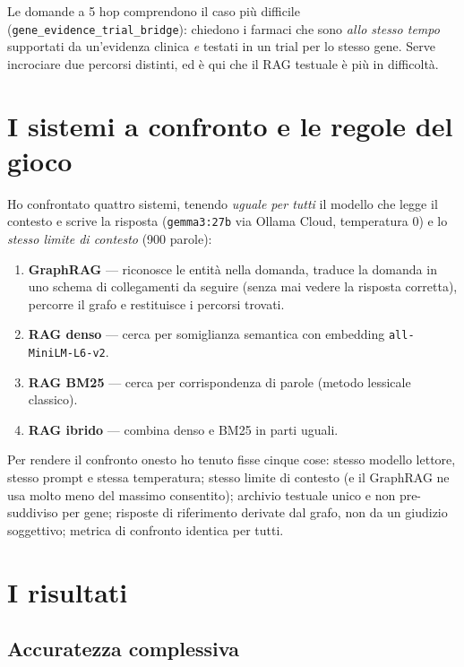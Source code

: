 \documentclass[11pt,a4paper]{report}
\begin{document}
Le domande a 5 hop comprendono il caso più difficile
(\texttt{gene\_evidence\_trial\_bridge}): chiedono i farmaci che sono
\emph{allo stesso tempo} supportati da un'evidenza clinica \emph{e} testati
in un trial per lo stesso gene. Serve incrociare due percorsi distinti, ed
è qui che il RAG testuale è più in difficoltà.

\section{I sistemi a confronto e le regole del gioco}

Ho confrontato quattro sistemi, tenendo \emph{uguale per tutti} il modello
che legge il contesto e scrive la risposta (\texttt{gemma3:27b} via Ollama
Cloud, temperatura 0) e lo \emph{stesso limite di contesto} (900 parole):

\begin{enumerate}
  \item \textbf{GraphRAG} --- riconosce le entità nella domanda, traduce la
        domanda in uno schema di collegamenti da seguire (senza mai vedere
        la risposta corretta), percorre il grafo e restituisce i percorsi
        trovati.
  \item \textbf{RAG denso} --- cerca per somiglianza semantica con embedding
        \texttt{all-MiniLM-L6-v2}.
  \item \textbf{RAG BM25} --- cerca per corrispondenza di parole (metodo
        lessicale classico).
  \item \textbf{RAG ibrido} --- combina denso e BM25 in parti uguali.
\end{enumerate}

Per rendere il confronto onesto ho tenuto fisse cinque cose: stesso modello
lettore, stesso prompt e stessa temperatura; stesso limite di contesto (e
il GraphRAG ne usa molto meno del massimo consentito); archivio testuale
unico e non pre-suddiviso per gene; risposte di riferimento derivate dal
grafo, non da un giudizio soggettivo; metrica di confronto identica per
tutti.

\section{I risultati}

\subsection{Accuratezza complessiva}
\end{document}
